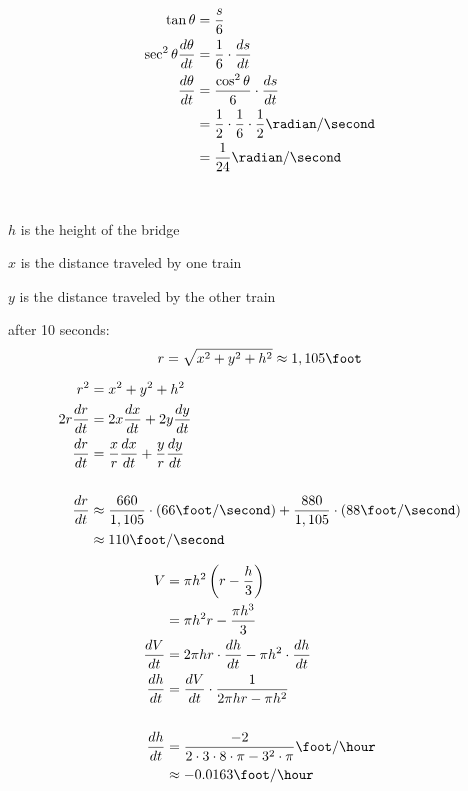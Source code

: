 \documentclass[fleqn]{exam}
\begin{document}
\begin{description}
\begin{enumerate}[a]
\begin{align*}
  \tan \theta &= \frac{s}{6} \\
  \sec^2 \theta \frac{d \theta}{dt} &= \frac{1}{6} \cdot \frac{ds}{dt} \\
  \frac{d \theta}{dt} &= \frac{\cos^2 \theta}{6} \cdot \frac{ds}{dt} \\
   &= \frac{1}{2} \cdot \frac{1}{6} \cdot \frac{1}{2} \radian / \second \\
   &= \frac{1}{24} \radian / \second \\
\end{align*}
\end{enumerate}

\item[19]
\
\begin{itemize*}
\item $h$ is the height of the bridge
\item $x$ is the distance traveled by one train
\item $y$ is the distance traveled by the other train
\end{itemize*}

after 10 seconds:
\[
  r = \sqrt{x^2 + y^2 + h^2} \approx 1,105 \foot \\
\]

\begin{align*}
  r^2 &= x^2 + y^2 + h^2 \\
  2r \frac{dr}{dt} &= 2x \frac{dx}{dt} + 2y \frac{dy}{dt} \\
  \frac{dr}{dt} &= \frac{x}{r} \frac{dx}{dt} + \frac{y}{r} \frac{dy}{dt} \\
  \\
  \frac{dr}{dt} &\approx \frac{660}{1,105} \cdot (66 \foot / \second) + \frac{880}{1,105} \cdot (88 \foot / \second) \\
                &\approx 110 \foot / \second \\
\end{align*}

\item[21]
\begin{align*}
  V &= \pi h^2 \left( r - \frac{h}{3} \right) \\
    &= \pi h^2r - \frac{\pi h^3}{3} \\
 \frac{dV}{dt} &= 2 \pi hr \cdot \frac{dh}{dt} - \pi h^2 \cdot \frac{dh}{dt} \\
  \frac{dh}{dt} &= \frac{dV}{dt} \cdot \frac{1}{2 \pi hr - \pi h^2} \\
  \\
  \frac{dh}{dt} &= \frac{-2}{2 \cdot 3 \cdot 8 \cdot \pi - 3^2 \cdot \pi } \foot / \hour \\
                &\approx -0.0163 \foot / \hour \\
\end{align*}


\end{description}
\end{document}
